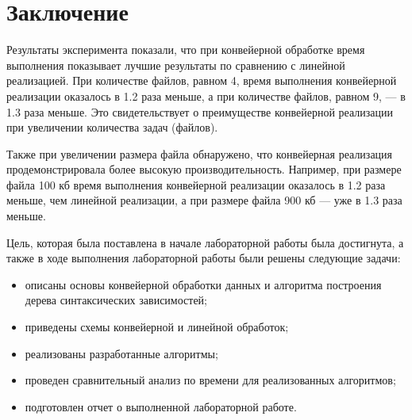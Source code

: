 \chapter*{Заключение}

Результаты эксперимента показали, что при конвейерной обработке время выполнения показывает лучшие результаты по сравнению с линейной реализацией. 
При количестве файлов, равном 4, время выполнения конвейерной реализации оказалось в 1.2 раза меньше, а при количестве файлов, равном 9, --- в 1.3 раза меньше. 
Это свидетельствует о преимуществе конвейерной реализации при увеличении количества задач (файлов).

Также при увеличении размера файла обнаружено, что конвейерная реализация продемонстрировала более высокую производительность. 
Например, при размере файла 100 кб время выполнения конвейерной реализации оказалось в 1.2 раза меньше, чем линейной реализации, а при размере файла 900 кб --- уже в 1.3 раза меньше.

Цель, которая была поставлена в начале лабораторной работы была достигнута, а также в ходе выполнения лабораторной работы были решены следующие задачи:

\begin{itemize}[label=---]
	\item описаны основы конвейерной обработки данных и алгоритма построения дерева синтаксических зависимостей;
	\item приведены схемы конвейерной и линейной обработок;
	\item реализованы разработанные алгоритмы;
	\item проведен сравнительный анализ по времени для реализованных алгоритмов;
	\item подготовлен отчет о выполненной лабораторной работе.
\end{itemize}
